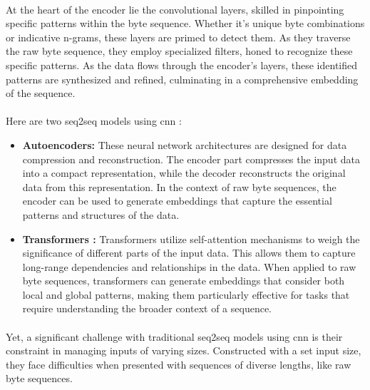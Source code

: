         \paragraph{}At the heart of the encoder lie the convolutional layers, skilled in pinpointing specific patterns within the byte sequence. Whether it's unique byte combinations or indicative n-grams, these layers are primed to detect them. As they traverse the raw byte sequence, they employ specialized filters, honed to recognize these specific patterns. As the data flows through the encoder's layers, these identified patterns are synthesized and refined, culminating in a comprehensive embedding of the sequence.

        \paragraph{}Here are two \acrfull{seq2seq} models using \acrshort{cnn} :
        

        \begin{itemize}
            \item \textbf{Autoencoders:} These neural network architectures\cite{hinton_reducing_2006} are designed for data compression and reconstruction. The encoder part compresses the input data into a compact representation, while the decoder reconstructs the original data from this representation. In the context of raw byte sequences, the encoder can be used to generate embeddings that capture the essential patterns and structures of the data.

            \item \textbf{Transformers :} Transformers\cite{vaswani_attention_2017} utilize self-attention mechanisms to weigh the significance of different parts of the input data. This allows them to capture long-range dependencies and relationships in the data. When applied to raw byte sequences, transformers can generate embeddings that consider both local and global patterns, making them particularly effective for tasks that require understanding the broader context of a sequence.

        \end{itemize}
        
        \paragraph{}Yet, a significant challenge with traditional \acrfull{seq2seq} models using \acrshort{cnn} is their constraint in managing inputs of varying sizes. Constructed with a set input size, they face difficulties when presented with sequences of diverse lengths, like raw byte sequences.

